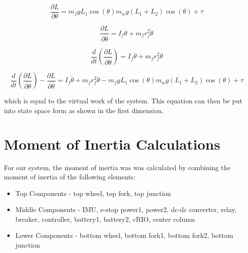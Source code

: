 \documentclass{article}
\begin{document}
\begin{equation}
\frac{\partial{L}}{\partial{{\theta}}} =  m_{f} g L_{1} \cos(\theta)  m_{w} g (L_{1} + L_{2}) \cos(\theta) + \tau
\end{equation}

\begin{equation}
\frac{\partial{L}}{\partial{\dot{\theta}}} = I_{f} \dot{\theta} + m_{f} r_{f}^2 \dot{\theta}
\end{equation}

\begin{equation}
\frac{d}{dt} \left(\frac{\partial{L}}{\partial{\dot{\theta}}}\right) = I_{f} \ddot{\theta} + m_{f} r_{f}^2 \ddot{\theta}
\end{equation}

\begin{equation}
\frac{d}{dt} \left(\frac{\partial{L}}{\partial{\dot{\theta}}}\right) - \frac{\partial{L}}{\partial{\dot{\theta}}} = I_{f} \ddot{\theta} + m_{f} r_{f}^2 \ddot{\theta} -  m_{f} g L_{1} \cos(\theta)  m_{w} g (L_{1} + L_{2}) \cos(\theta) + \tau
\end{equation}

which is equal to the virtual work of the system.  This equation can then be put into state space form as shown in the first dimension.



\newpage
\section{Moment of Inertia Calculations}
For our system, the moment of inertia was was calculated by combining the moment of inertia of the following elements:
\begin{itemize}
\item Top Components - top wheel, top fork, top junction
\item Middle Components - IMU, e-stop power1, power2, dc-dc converter, relay, breaker, controller, battery1, battery2, cRIO, center column
\item Lower Components - bottom wheel, bottom fork1, bottom fork2, bottom junction \\
\end{itemize} 
\end{document}
